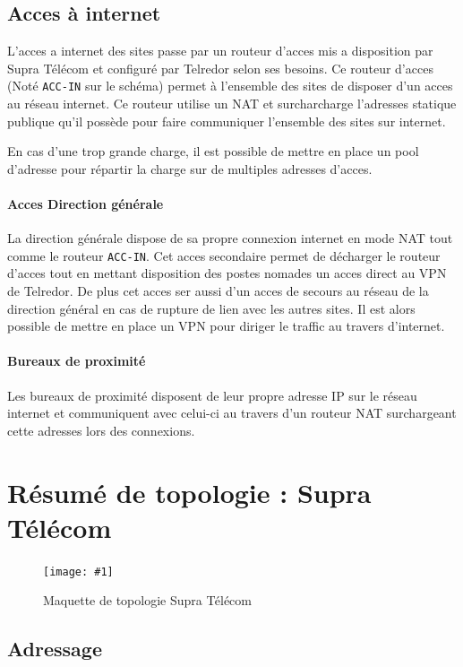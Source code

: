 \documentclass{article}
\newenvironment{figue}[1]{
	\par
	\bigskip
	\begin{figure}[h]
	\begin{center}
	  \texttt{[image: \#1]}
	\end{center}
}{
	\end{figure}
	\bigskip
}
\newcommand{\tlr}{Telredor\xspace}
\newcommand{\spr}{Supra Télécom\xspace}
\begin{document}
\subsection{Acces à internet}

L'acces a internet des sites passe par un routeur d'acces mis a disposition par \spr et configuré par \tlr selon ses besoins.
Ce routeur d'acces (Noté \texttt{ACC-IN} sur le schéma) permet à l'ensemble des sites de disposer d'un acces au réseau internet.
Ce routeur utilise un NAT et surcharcharge l'adresses statique publique qu'il possède pour faire communiquer l'ensemble des sites sur internet.

En cas d'une trop grande charge, il est possible de mettre en place un pool d'adresse pour répartir la charge sur de multiples adresses d'acces.

\paragraph{Acces Direction générale}
La direction générale dispose de sa propre connexion internet en mode NAT tout comme le routeur \texttt{ACC-IN}.
Cet acces secondaire permet de décharger le routeur d'acces tout en mettant disposition des postes nomades un acces direct au VPN de \tlr.
De plus cet acces ser aussi d'un acces de secours au réseau de la direction général en cas de rupture de lien avec les autres sites. Il est alors possible de mettre en place un VPN pour diriger le traffic au travers d'internet.

\paragraph{Bureaux de proximité} Les bureaux de proximité disposent de leur propre adresse IP sur le réseau internet et communiquent avec celui-ci au travers d'un routeur NAT surchargeant cette adresses lors des connexions.

\clearpage
\section{Résumé de topologie : \spr}

\begin{figue}{img/nuage-supra.pdf}
	\caption{Maquette de topologie \spr}
\end{figue}

\subsection{Adressage}
\end{document}
